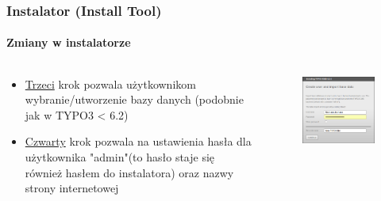 
\begin{frame}[fragile]
	\frametitle{Instalator (Install Tool)}
	\framesubtitle{Zmiany w instalatorze}

	\begin{columns}[T]

		\begin{column}{.5\textwidth}
			\begin{itemize}
				\item \underline{Trzeci} krok pozwala użytkownikom wybranie/utworzenie bazy danych (podobnie jak w TYPO3 < 6.2)
				\item \underline{Czwarty} krok pozwala na ustawienia hasła dla użytkownika "admin"\newline (to hasło staje się również hasłem do instalatora) oraz nazwy strony internetowej
			\end{itemize}
		\end{column}

		\begin{column}{.5\textwidth}
			\begin{figure}\vspace*{-0.4cm}
				\includegraphics[width=0.8\linewidth]{Images/InstallTool/AdminPasswordAndSiteName.png}
			\end{figure}
		\end{column}

	\end{columns}

\end{frame}

